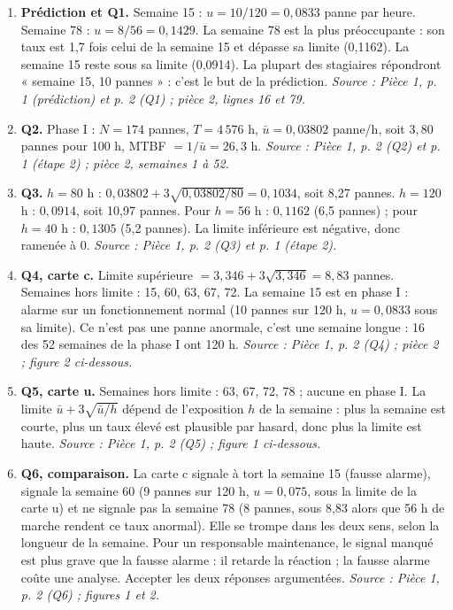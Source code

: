 \documentclass[10pt,a4paper]{article}
\newcommand{\src}[1]{{\footnotesize\color{uimm}\textit{Source : #1}}}
\begin{document}
\begin{enumerate}[label=\textcolor{cyan}{\textbf{Q\arabic*.}},leftmargin=22pt,itemsep=5pt]
\item \textbf{Prédiction et Q1.} Semaine 15 : $u = 10/120 = 0{,}0833$ panne par heure. Semaine 78 : $u = 8/56 = 0{,}1429$. La semaine 78 est la plus préoccupante : son taux est 1,7 fois celui de la semaine 15 et dépasse sa limite (0,1162). La semaine 15 reste sous sa limite (0,0914). La plupart des stagiaires répondront « semaine 15, 10 pannes » : c'est le but de la prédiction. \src{Pièce 1, p. 1 (prédiction) et p. 2 (Q1) ; pièce 2, lignes 16 et 79.}
\item \textbf{Q2.} Phase I : $N = 174$ pannes, $T = 4\,576$ h, $\bar u = 0{,}03802$ panne/h, soit $3{,}80$ pannes pour 100 h, MTBF $= 1/\bar u = 26{,}3$ h. \src{Pièce 1, p. 2 (Q2) et p. 1 (étape 2) ; pièce 2, semaines 1 à 52.}
\item \textbf{Q3.} $h = 80$ h : $0{,}03802 + 3\sqrt{0{,}03802/80} = 0{,}1034$, soit 8,27 pannes. $h = 120$ h : $0{,}0914$, soit 10,97 pannes. Pour $h = 56$ h : $0{,}1162$ (6,5 pannes) ; pour $h = 40$ h : $0{,}1305$ (5,2 pannes). La limite inférieure est négative, donc ramenée à 0. \src{Pièce 1, p. 2 (Q3) et p. 1 (étape 2).}
\item \textbf{Q4, carte c.} Limite supérieure $= 3{,}346 + 3\sqrt{3{,}346} = 8{,}83$ pannes. Semaines hors limite : 15, 60, 63, 67, 72. La semaine 15 est en phase I : alarme sur un fonctionnement normal (10 pannes sur 120 h, $u = 0{,}0833$ sous sa limite). Ce n'est pas une panne anormale, c'est une semaine longue : 16 des 52 semaines de la phase I ont 120 h. \src{Pièce 1, p. 2 (Q4) ; pièce 2 ; figure 2 ci-dessous.}
\item \textbf{Q5, carte u.} Semaines hors limite : 63, 67, 72, 78 ; aucune en phase I. La limite $\bar u + 3\sqrt{\bar u/h}$ dépend de l'exposition $h$ de la semaine : plus la semaine est courte, plus un taux élevé est plausible par hasard, donc plus la limite est haute. \src{Pièce 1, p. 2 (Q5) ; figure 1 ci-dessous.}
\item \textbf{Q6, comparaison.} La carte c signale à tort la semaine 15 (fausse alarme), signale la semaine 60 (9 pannes sur 120 h, $u = 0{,}075$, sous la limite de la carte u) et ne signale pas la semaine 78 (8 pannes, sous 8,83 alors que 56 h de marche rendent ce taux anormal). Elle se trompe dans les deux sens, selon la longueur de la semaine. Pour un responsable maintenance, le signal manqué est plus grave que la fausse alarme : il retarde la réaction ; la fausse alarme coûte une analyse. Accepter les deux réponses argumentées. \src{Pièce 1, p. 2 (Q6) ; figures 1 et 2.}

\end{enumerate}
\end{document}
